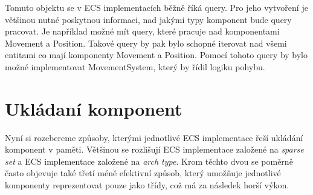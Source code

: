 Tomuto objektu se v ECS implementacích běžně říká query. Pro jeho vytvoření je většinou nutné poskytnou informaci, nad jakými typy komponent bude query pracovat. Je například možné mít query, které pracuje nad komponentami Movement a Position. Takové query by pak bylo schopné iterovat nad všemi entitami co mají komponenty Movement a Position. Pomocí tohoto query by bylo možné implementovat MovementSystem, který by řídil logiku pohybu.






\section{Ukládaní komponent}
Nyní si rozebereme způsoby, kterými jednotlivé ECS implementace řeší ukládání komponent v paměti. Většinou se rozlišují ECS implementace založené na \textit{sparse set} a ECS implementace založené na \textit{arch type}. Krom těchto dvou se poměrně často objevuje také třetí méně efektivní způsob, který umožňuje jednotlivé komponenty reprezentovat pouze jako třídy, což má za následek horší výkon.

